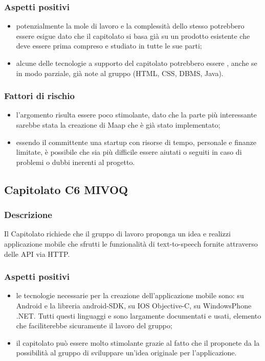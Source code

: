 \documentclass[12pt,a4paper]{article}
\begin{document}
\subsubsection{Aspetti positivi}
\begin{itemize}
\item potenzialmente la mole di lavoro e la complessità dello stesso potrebbero essere esigue dato che il capitolato si basa già su un prodotto esistente che deve essere prima compreso e studiato in tutte le sue parti;

\item alcune delle tecnologie a supporto del capitolato potrebbero essere , anche se in modo parziale, già note al gruppo (HTML, CSS, DBMS, Java).
\end{itemize}

\subsubsection{Fattori di rischio}
\begin{itemize}
\item l'argomento risulta essere poco stimolante, dato che la parte più interessante sarebbe stata la creazione di Maap che è già stato implementato;

\item essendo il committente una startup con risorse di tempo, personale e finanze limitate, è possibile che sia più difficile essere aiutati o seguiti in caso di problemi o dubbi inerenti al progetto.
\end{itemize}

\newpage
\subsection{Capitolato C6 MIVOQ}
\subsubsection{Descrizione}

Il Capitolato richiede che il gruppo di lavoro proponga un idea e realizzi applicazione mobile che sfrutti le funzionalità di text-to-speech fornite attraverso delle API via HTTP.

\subsubsection{Aspetti positivi}
\begin{itemize}
 \item le tecnologie necessarie per la creazione dell'applicazione mobile sono: su Android  e la libreria android-SDK, su IOS Objective-C, su WindowsPhone .NET. Tutti questi linguaggi e  sono largamente documentati e usati, elemento che faciliterebbe sicuramente il lavoro del gruppo;
 \item il capitolato può essere molto stimolante grazie al fatto che il proponete da la possibilità al gruppo di sviluppare un'idea originale per l'applicazione. 
\end{itemize}
\end{document}
